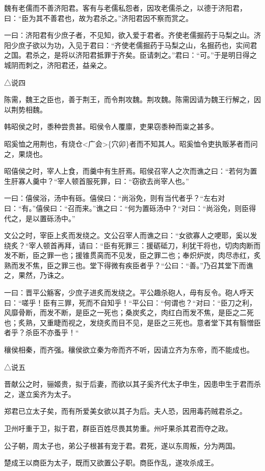 \documentclass[]{article}
\begin{document}
魏有老儒而不善济阳君。客有与老儒私怨者，因攻老儒杀之，以德于济阳君，曰：``臣为其不善君也，故为君杀之。''济阳君因不察而赏之。

一曰：济阳君有少庶子者，不见知，欲入爱于君者。齐使老儒掘药于马梨之山。济阳少庶子欲以为功，入见于君曰：``齐使老儒掘药于马梨之山，名掘药也，实间君之国。君杀之，是将以济阳君抵罪于齐矣。臣请刺之。''君曰：``可。''于是明日得之城阴而刺之，济阳君还，益亲之。

△说四

陈需，魏王之臣也，善于荆王，而令荆攻魏。荆攻魏。陈需因请为魏王行解之，因以荆势相魏。

韩昭侯之时，黍种尝贵甚。昭侯令人覆廪，吏果窃黍种而粜之甚多。

昭奚恤之用荆也，有烧仓\textless{}广会\textgreater{}\{穴卯\}者而不知其人。昭奚恤令吏执贩茅者而问之，果烧也。

昭僖侯之时，宰人上食，而羹中有生肝焉。昭侯召宰人之次而谯之曰：``若何为置生肝寡人羹中？``宰人顿首服死罪，曰：``窃欲去尚宰人也。''

一曰：僖侯浴，汤中有砾。僖侯曰：``尚浴免，则有当代者乎？``左右对曰：``有。''僖侯曰：``召而来。''谯之曰：``何为置砾汤中？``对曰：``尚浴免，则臣得代之，是以置砾汤中。''

文公之时，宰臣上炙而发绕之。文公召宰人而谯之曰：``女欲寡人之哽耶，奚以发绕炙？``宰人顿首再拜，请曰：``臣有死罪三：援砺砥刀，利犹干将也，切肉肉断而发不断，臣之罪一也；援锥贯脔而不见发，臣之罪二也；奉炽炉炭，肉尽赤红，炙熟而发不焦，臣之罪三也。堂下得微有疾臣者乎？``公曰：``善。''乃召其堂下而谯之，果然，乃诛之。

一曰：晋平公觞客，少庶子进炙而发绕之。平公趣杀砲人，毋有反令。砲人呼天曰：``嗟乎！臣有三罪，死而不自知乎！``平公曰：``何谓也？``对曰：``臣刀之利，风靡骨断，而发不断，是臣之一死也；桑炭炙之，肉红白而发不焦，是臣之二死也；炙熟，又重睫而视之，发绕炙而目不见，是臣之三死也。意者堂下其有翳憎臣者乎？杀臣不亦蚤乎！``

穰侯相秦，而齐强。穰侯欲立秦为帝而齐不听，因请立齐为东帝，而不能成也。

△说五

晋献公之时，骊姬贵，拟于后妻，而欲以其子奚齐代太子申生，因患申生于君而杀之，遂立奚齐为太子。

郑君已立太子矣，而有所爱美女欲以其子为后。夫人恐，因用毒药贼君杀之。

卫州吁重于卫，拟于君，群臣百姓尽畏其势重。州吁果杀其君而夺之政。

公子朝，周太子也，弟公子根甚有宠于君。君死，遂以东周叛，分为两国。

楚成王以商臣为太子，既而又欲置公子职。商臣作乱，遂攻杀成王。
\end{document}
